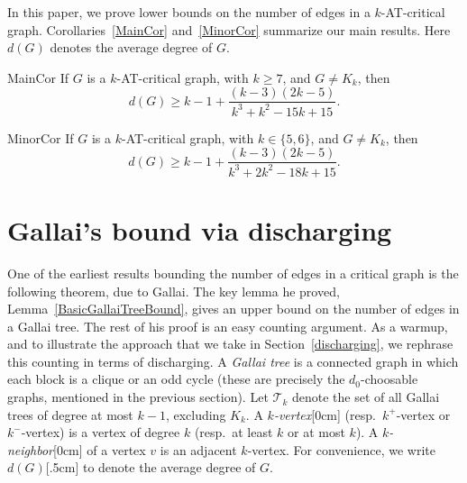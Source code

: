 \documentclass[12pt]{article}
\theoremstyle{plain}
\theoremstyle{definition}
\theoremstyle{remark}
\newcommand{\fancy}[1]{\mathcal{#1}}
\newcommand{\T}{\fancy{T}}
\newcommand{\aside}[1]{\marginnote{\scriptsize{#1}}[0cm]}
\newcommand{\aaside}[2]{\marginnote{\scriptsize{#1}}[#2]}
\begin{document}
In this paper, we prove lower bounds on the number of edges in a $k$-AT-critical
graph.  Corollaries~\ref{MainCor} and~\ref{MinorCor} summarize our main results.
Here $d(G)$ denotes the average degree of $G$.

\begin{repcor}{MainCor}
If $G$ is a $k$-AT-critical graph, with $k\ge 7$, and $G\ne K_k$, then
\[d(G) \ge k-1 + \frac{(k-3)(2k-5)}{k^3 + k^2 - 15k + 15}.\]
\end{repcor}


\begin{repcor}{MinorCor}
If $G$ is a $k$-AT-critical graph, with $k\in\{5,6\}$, and $G\ne K_k$, then
\[d(G) \ge k-1 + \frac{(k-3)(2k-5)}{k^3 + 2k^2 - 18k + 15}.\]
\end{repcor}

\section{Gallai's bound via discharging}
\label{sec:gallai}

One of the earliest results bounding the number of edges in a critical graph is
the following theorem, due to Gallai.  The key lemma he proved,
Lemma~\ref{BasicGallaiTreeBound}, gives an upper bound on the number of edges
in a Gallai tree.  The rest of his proof is an easy
counting argument.  As a warmup, and to illustrate the approach that we take in
Section~\ref{discharging}, we rephrase this counting in terms of
discharging.  A \emph{Gallai tree} is a connected graph in which each block is a
clique or an odd cycle (these are precisely the $d_0$-choosable graphs,
mentioned in the previous section).  Let $\T_k$ denote the set of all Gallai
trees of degree at most $k-1$, excluding $K_k$. A
\emph{$k$-vertex}\aside{$k$-vertex} (resp.~$k^+$-vertex or $k^-$-vertex) is a
vertex of degree $k$ (resp.~at least $k$ or at most $k$).  A
\emph{$k$-neighbor}\aside{$k$-neighbor} of a vertex $v$ is an adjacent $k$-vertex.
For convenience, we write $d(G)$\aaside{$d(G)$}{.5cm} to denote the average degree of $G$.
\end{document}
